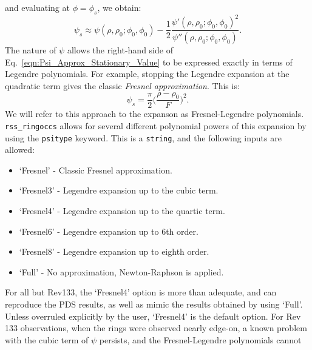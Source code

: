 \documentclass[titlepage, 12pt]{article}
\begin{document}
            and evaluating at $\phi=\phi_{s}$, we obtain:
            \begin{equation}
                \label{eqn:Psi_Approx_Stationary_Value}
                \psi_{s}\approx\psi(\rho,\rho_{0};\phi_{0},\phi_{0})-\frac{1}{2}
                    \frac{\psi'(\rho,\rho_{0};\phi_{0},\phi_{0})^{2}}
                         {\psi''(\rho,\rho_{0};\phi_{0},\phi_{0})}.
            \end{equation}
            The nature of $\psi$ allows the right-hand side of
            Eq.~\ref{eqn:Psi_Approx_Stationary_Value} to be expressed
            exactly in terms of Legendre polynomials. For example, stopping the
            Legendre expansion at the quadratic term gives the classic
            \textit{Fresnel approximation}. This is:
            \begin{equation}
                \psi_{s}=\frac{\pi}{2}\Big(\frac{\rho-\rho_{0}}{F}\Big)^{2}.
            \end{equation}
            We will refer to this approach to the expanson as
            Fresnel-Legendre polynomials.
            \texttt{rss\_ringoccs} allows for several different polynomial
            powers of this expansion by using the \texttt{psitype} keyword.
            This is a \texttt{string}, and the following inputs are allowed:
            \begin{itemize}
                \item `Fresnel' - Classic Fresnel approximation.
                \item `Fresnel3' - Legendre expansion up to the cubic term.
                \item `Fresnel4' - Legendre expansion up to the quartic term.
                \item `Fresnel6' - Legendre expansion up to 6th order.
                \item `Fresnel8' - Legendre expansion up to eighth order.
                \item `Full' - No approximation, Newton-Raphson is applied.
            \end{itemize}
            For all but Rev133, the `Fresnel4' option is more than adequate,
            and can reproduce the PDS results, as well as mimic the results
            obtained by using `Full'. Unless overruled explicitly by the user, `Fresnel4' is the default option. For Rev 133 observations, when the rings were observed nearly edge-on, a known problem with the cubic term of
            $\psi$ persists, and the Fresnel-Legendre polynomials cannot
\end{document}
